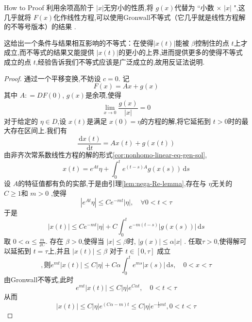 \documentclass[lang=cn,12pt,color=green,fontset=none]{elegantbook}
\begin{document}
\begin{note}
    How to Proof 
    利用余项高阶于 $ \left| x \right|  $无穷小的性质,将 $ g\left( x \right)  $代替为 “小数 $ \times  $ $ \left| x \right|  $  ",这几乎就将 $ F\left( x \right)  $化作线性方程,可以使用Gronwall不等式（它几乎就是线性方程解的不等号版本）的结果 .

    这给出一个条件与结果相互影响的不等式：在使得$ \left| x\left( t \right)  \right|  $能被 $ \beta  $控制住的点 $ t $上才成立,而不等式的结果又能提供 $ \left| x\left( t \right)  \right|  $的更小的上界,进而提供更多的使得不等式成立的点 $ t $,经验告诉我们不等式应该是广泛成立的,故用反证法说明.  
\end{note}
\begin{proof}
    通过一个平移变换,不妨设 $ c=0 $. 
    记 $$
    F\left( x \right) = Ax+  g\left( x \right)  
    $$其中 $ A: = DF \left( 0 \right)  $, $ g\left( x \right)  $是余项,使得 $$
    \lim_{x \to 0} \frac{g\left( x \right)  }{\left| x \right|  }=0 
    $$  对于给定的 $ \eta  \in D $,设 $ x\left( t \right)  $是满足 $ x\left( 0 \right)=\eta   $的方程的解,将它延拓到 $ t>0 $时的最大存在区间上.我们有 $$
    \frac{\,\mathrm{d} x\left( t \right)  }{\,\mathrm{d} t }= A x\left( t \right)+  g\left( x\left( t \right)  \right)   
    $$  由非齐次常系数线性方程的解的形式\ref{cor:nonhomo-linear-eq-gen-sol}, $$
    x\left( t \right)=  e^{A t }\eta +  \int_{0}^{t} e^{\left( t-s \right)A } g\left( x\left( s \right)  \right)\,\mathrm{d} s 
    $$设 $ A $的特征值都有负的实部,于是由引理\ref{lem:nega-Re-lemma},存在与 $ \eta  $无关的  $ C\ge 1 $和 $ m>0 $ ,使得 $$
    \left| e^{At}\eta  \right| \le Ce^{-mt} \left| \eta  \right|  ,\quad \forall  0<t<\tau 
    $$  于是 $$
    \left| x\left( t \right)  \right| \le  Ce^{-mt}\left| \eta  \right|+  C\int_{0}^{t}  e^{-m\left( t-s \right) } \left| g\left( x\left( s \right)  \right)  \right| \,\mathrm{d} s 
    $$取 $ 0<\alpha \le \frac{m}{2C} $.    存在 $ \beta >0 $,使得当 $ \left| x \right|\le \beta   $时, $ \left| g\left( x \right)  \right|\le  \alpha \left| x \right|   $    .
    任取$  \tau >0 $,使得解可以延拓到 $ t= \tau  $上,并且 $ \left| x\left( t \right)  \right|\le \beta   $   对于 $ t \in [0,\tau ] $ 成立 $$,则
   e^{mt} \left| x\left( t \right)  \right| \le  C\left| \eta  \right|+  C \alpha   \int_{0}^{t}e^{ms}\left| x\left( s \right)  \right|\,\mathrm{d} s ,\quad  0<x<\tau 
    $$由Gronwall不等式,此时 $$
    e^{mt}\left| x\left( t \right)  \right| \le  C\left| \eta  \right|  e^{C\alpha t },\quad  0<t<\tau 
    $$从而 $$
    \left| x\left( t \right)  \right| \le   C\left| \eta  \right| e^{\left( C\alpha -m \right) t}\le C\left| \eta  \right| e^{-\frac{1}{2}mt},0<t<\tau 
    $$
    

\end{proof}
\end{document}
